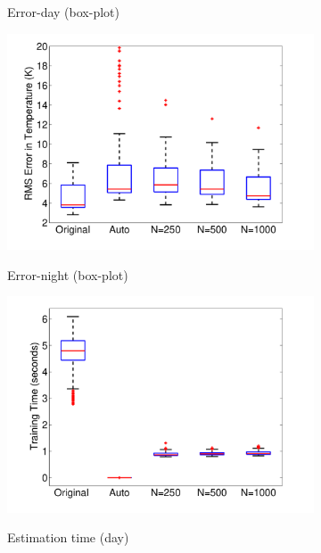 \documentclass[letterpaper,12pt,peerreviewca,draftcls]{IEEEtran}
\begin{document}
\begin{figure}
\begin{subfigure}[t]{0.41\textwidth}
		\label{fig:pathfinder_errors_boxplots_day}
		\caption{Error-day (box-plot)}
	\end{subfigure}
	\begin{subfigure}[t]{0.41\textwidth}
		\includegraphics[width=\linewidth]{"Figure 13f"}
		\label{fig:pathfinder_errors_boxplots}
		\caption{Error-night (box-plot)}
	\end{subfigure}
	\begin{subfigure}[t]{0.41\textwidth}
		\includegraphics[width=\linewidth]{"Figure 13g"}
		\label{fig:pathfinder_tr_times_boxplots_day}
		\caption{Estimation time (day)}
	\end{subfigure}
	\begin{subfigure}[t]{0.41\textwidth}

\end{subfigure}
\end{figure}
\end{document}

